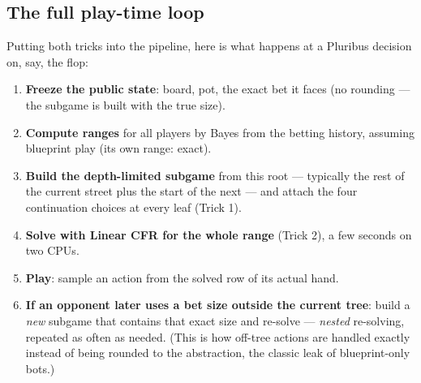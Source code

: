 \documentclass[11pt,a4paper]{article}
\begin{document}
\subsection{The full play-time loop}

Putting both tricks into the pipeline, here is what happens at a Pluribus
decision on, say, the flop:

\begin{enumerate}[leftmargin=1.6em, itemsep=1pt]
\item \textbf{Freeze the public state}: board, pot, the exact bet it faces
  (no rounding --- the subgame is built with the true size).
\item \textbf{Compute ranges} for all players by Bayes from the betting
  history, assuming blueprint play (its own range: exact).
\item \textbf{Build the depth-limited subgame} from this root --- typically
  the rest of the current street plus the start of the next --- and attach
  the four continuation choices at every leaf (Trick 1).
\item \textbf{Solve with Linear CFR for the whole range} (Trick 2), a few
  seconds on two CPUs.
\item \textbf{Play}: sample an action from the solved row of its actual
  hand.
\item \textbf{If an opponent later uses a bet size outside the current
  tree}: build a \emph{new} subgame that contains that exact size and
  re-solve --- \emph{nested} re-solving, repeated as often as needed. (This
  is how off-tree actions are handled exactly instead of being rounded to
  the abstraction, the classic leak of blueprint-only bots.)
\end{enumerate}
\end{document}
